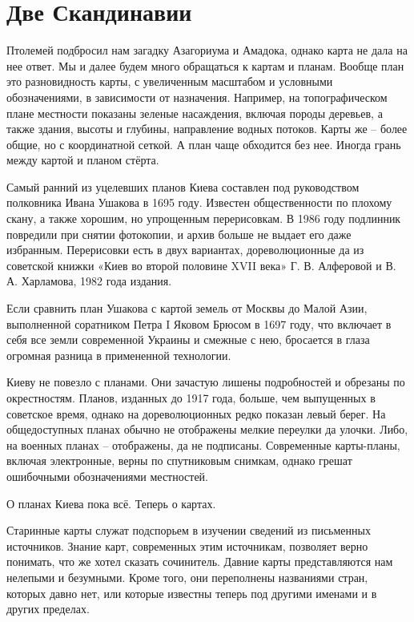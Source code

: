 \chapter{Две Скандинавии}

Птолемей подбросил нам загадку Азагориума и Амадока, однако карта не дала на нее ответ. Мы и далее будем много обращаться к картам и планам. Вообще план это разновидность карты, с увеличенным масштабом и условными обозначениями, в зависимости от назначения. Например, на топографическом плане местности показаны зеленые насаждения, включая породы деревьев, а также здания, высоты и глубины, направление водных потоков. Карты же – более общие, но с координатной сеткой. А план чаще обходится без нее. Иногда грань между картой и планом стёрта.

Самый ранний из уцелевших планов Киева составлен под руководством полковника Ивана Ушакова в 1695 году. Известен общественности по плохому скану, а также хорошим, но упрощенным перерисовкам. В 1986 году подлинник повредили при снятии фотокопии, и архив больше не выдает его даже избранным. Перерисовки есть в двух вариантах, дореволюционные да из советской книжки «Киев во второй половине XVII века» Г. В. Алферовой и В. А. Харламова, 1982 года издания.

Если сравнить план Ушакова с картой земель от Москвы до Малой Азии, выполненной соратником Петра I Яковом Брюсом в 1697 году, что включает в себя все земли современной Украины и смежные с нею, бросается в глаза огромная разница в примененной технологии.

Киеву не повезло с планами. Они зачастую лишены подробностей и обрезаны по окрестностям. Планов, изданных до 1917 года, больше, чем выпущенных в советское время, однако на дореволюционных редко показан левый берег. На общедоступных планах обычно не отображены мелкие переулки да улочки. Либо, на военных планах – отображены, да не подписаны. Современные карты-планы, включая электронные, верны по спутниковым снимкам, однако грешат ошибочными обозначениями местностей.

О планах Киева пока всё. Теперь о картах.

Старинные карты служат подспорьем в изучении сведений из письменных источников. Знание карт, современных этим источникам, позволяет верно понимать, что же хотел сказать сочинитель. Давние карты представляются нам нелепыми и безумными. Кроме того, они переполнены названиями стран, которых давно нет, или которые известны теперь под другими именами и в других пределах.

